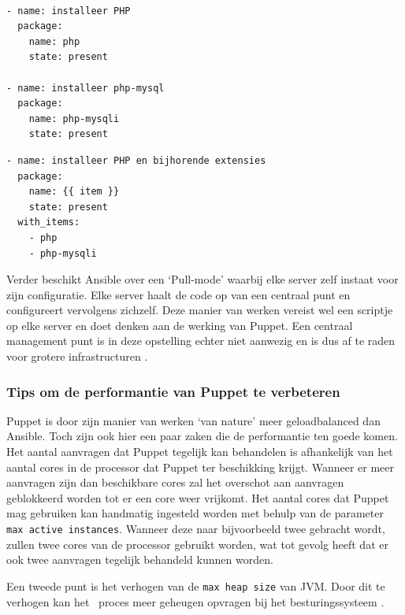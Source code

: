 \begin{lstlisting}[frame=single]

- name: installeer PHP
  package:
    name: php
    state: present

- name: installeer php-mysql
  package:
    name: php-mysqli
    state: present
\end{lstlisting}

\begin{lstlisting}[frame=single]
- name: installeer PHP en bijhorende extensies
  package:
    name: {{ item }}
    state: present
  with_items:
    - php
    - php-mysqli
\end{lstlisting}

  Verder beschikt Ansible over een ‘Pull-mode' waarbij elke server zelf instaat voor zijn configuratie. Elke server haalt de code op van een centraal punt en configureert vervolgens zichzelf. Deze manier van werken vereist wel een scriptje op elke server en doet denken aan de werking van Puppet. Een centraal management punt is in deze opstelling echter niet aanwezig en is dus af te raden voor grotere infrastructuren \autocite{AnsibleTuning} .
  
 \subsubsection{Tips om de performantie van Puppet te verbeteren}
 Puppet is door zijn manier van werken ‘van nature' meer geloadbalanced dan Ansible. Toch zijn ook hier een paar zaken die de performantie ten goede komen. Het aantal aanvragen dat Puppet tegelijk kan behandelen is afhankelijk van het aantal cores in de processor dat Puppet ter beschikking krijgt. Wanneer er meer aanvragen zijn dan beschikbare cores zal het overschot aan aanvragen geblokkeerd worden tot er een core weer vrijkomt. Het aantal cores dat Puppet mag gebruiken kan handmatig ingesteld worden met behulp van de parameter \texttt{max active instances}. Wanneer deze naar bijvoorbeeld twee gebracht wordt, zullen twee cores van de processor gebruikt worden, wat tot gevolg heeft dat er ook twee aanvragen tegelijk behandeld kunnen worden. 
 
 Een tweede punt is het verhogen van de \texttt{max heap size} van \gls{JVM}. Door dit te verhogen kan het \ proces meer geheugen opvragen bij het besturingssysteem \autocite{PuppetTuning}.
 
